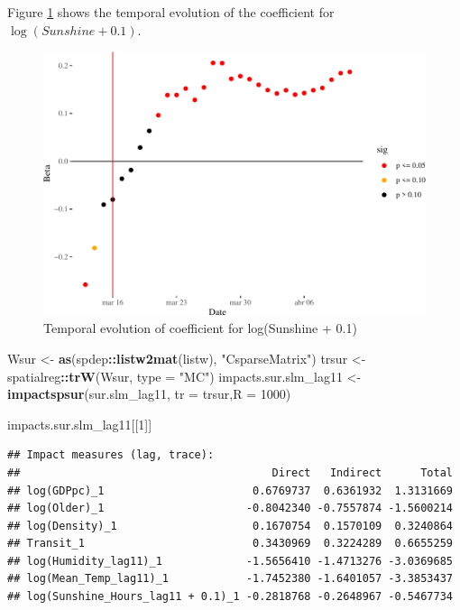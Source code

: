 \documentclass[]{elsarticle} %
\makeatletter
\newenvironment{Shaded}{\begin{snugshade}}{\end{snugshade}}
\newcommand{\DataTypeTok}[1]{\textcolor[rgb]{0.13,0.29,0.53}{#1}}
\newcommand{\DecValTok}[1]{\textcolor[rgb]{0.00,0.00,0.81}{#1}}
\newcommand{\KeywordTok}[1]{\textcolor[rgb]{0.13,0.29,0.53}{\textbf{#1}}}
\newcommand{\NormalTok}[1]{#1}
\newcommand{\OperatorTok}[1]{\textcolor[rgb]{0.81,0.36,0.00}{\textbf{#1}}}
\newcommand{\StringTok}[1]{\textcolor[rgb]{0.31,0.60,0.02}{#1}}
\def\maxwidth{\ifdim\Gin@nat@width>\linewidth\linewidth
\else\Gin@nat@width\fi}
\let\Oldincludegraphics\includegraphics
\renewcommand{\includegraphics}[1]{\Oldincludegraphics[width=\maxwidth]{#1}}
\makeatother
\begin{document}
Figure \ref{fig:beta-sunshine-time} shows the temporal evolution of the
coefficient for \(\log(Sunshine + 0.1)\).

\begin{figure}
\centering
\includegraphics{Environmental-Correlates-of-COVID19-Spain_files/figure-latex/beta-sunshine-time-1.pdf}
\caption{\label{fig:beta-sunshine-time}Temporal evolution of coefficient
for log(Sunshine + 0.1)}
\end{figure}

\begin{Shaded}
\begin{Highlighting}[]
\NormalTok{Wsur <-}\StringTok{ }\KeywordTok{as}\NormalTok{(spdep}\OperatorTok{::}\KeywordTok{listw2mat}\NormalTok{(listw), }\StringTok{"CsparseMatrix"}\NormalTok{)}
\NormalTok{trsur <-}\StringTok{ }\NormalTok{spatialreg}\OperatorTok{::}\KeywordTok{trW}\NormalTok{(Wsur, }\DataTypeTok{type =} \StringTok{"MC"}\NormalTok{)}
\NormalTok{impacts.sur.slm_lag11 <-}\StringTok{ }\KeywordTok{impactspsur}\NormalTok{(sur.slm_lag11, }\DataTypeTok{tr =}\NormalTok{ trsur,}\DataTypeTok{R =} \DecValTok{1000}\NormalTok{)}

\NormalTok{impacts.sur.slm_lag11[[}\DecValTok{1}\NormalTok{]]}
\end{Highlighting}
\end{Shaded}

\begin{verbatim}
## Impact measures (lag, trace):
##                                       Direct   Indirect      Total
## log(GDPpc)_1                       0.6769737  0.6361932  1.3131669
## log(Older)_1                      -0.8042340 -0.7557874 -1.5600214
## log(Density)_1                     0.1670754  0.1570109  0.3240864
## Transit_1                          0.3430969  0.3224289  0.6655259
## log(Humidity_lag11)_1             -1.5656410 -1.4713276 -3.0369685
## log(Mean_Temp_lag11)_1            -1.7452380 -1.6401057 -3.3853437
## log(Sunshine_Hours_lag11 + 0.1)_1 -0.2818768 -0.2648967 -0.5467734
\end{verbatim}
\end{document}
